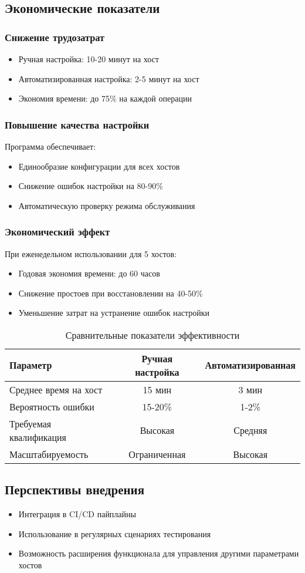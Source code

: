 \subsection{Экономические показатели}
\subsubsection{Снижение трудозатрат}
\begin{itemize}
    \item Ручная настройка: 10-20 минут на хост
    \item Автоматизированная настройка: 2-5 минут на хост
    \item Экономия времени: до 75\% на каждой операции
\end{itemize}

\subsubsection{Повышение качества настройки}
Программа обеспечивает:
\begin{itemize}
    \item Единообразие конфигурации для всех хостов
    \item Снижение ошибок настройки на 80-90\%
    \item Автоматическую проверку режима обслуживания
\end{itemize}

\subsubsection{Экономический эффект}
При еженедельном использовании для 5 хостов:
\begin{itemize}
    \item Годовая экономия времени: до 60 часов
    \item Снижение простоев при восстановлении на 40-50\%
    \item Уменьшение затрат на устранение ошибок настройки
\end{itemize}

\begin{table}[h]
\centering
\caption{Сравнительные показатели эффективности}
\begin{tabular}{|l|c|c|}
\hline
\textbf{Параметр} & \textbf{Ручная настройка} & \textbf{Автоматизированная} \\ \hline
Среднее время на хост & 15 мин & 3 мин \\ \hline
Вероятность ошибки & 15-20\% & 1-2\% \\ \hline
Требуемая квалификация & Высокая & Средняя \\ \hline
Масштабируемость & Ограниченная & Высокая \\ \hline
\end{tabular}
\end{table}

\subsection{Перспективы внедрения}
\begin{itemize}
    \item Интеграция в CI/CD пайплайны
    \item Использование в регулярных сценариях тестирования
    \item Возможность расширения функционала для управления другими параметрами хостов
\end{itemize}